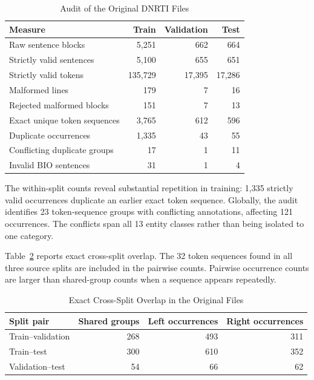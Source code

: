 \documentclass[conference]{IEEEtran}
\begin{document}
\begin{table}[t]
\caption{Audit of the Original DNRTI Files}
\label{tab:source-audit}
\centering
\small
\begin{tabular}{lrrr}
\toprule
Measure & Train & Validation & Test \\
\midrule
Raw sentence blocks & 5,251 & 662 & 664 \\
Strictly valid sentences & 5,100 & 655 & 651 \\
Strictly valid tokens & 135,729 & 17,395 & 17,286 \\
Malformed lines & 179 & 7 & 16 \\
Rejected malformed blocks & 151 & 7 & 13 \\
Exact unique token sequences & 3,765 & 612 & 596 \\
Duplicate occurrences & 1,335 & 43 & 55 \\
Conflicting duplicate groups & 17 & 1 & 11 \\
Invalid BIO sentences & 31 & 1 & 4 \\
\bottomrule
\end{tabular}
\end{table}

The within-split counts reveal substantial repetition in training: 1,335 strictly valid occurrences duplicate an earlier exact token sequence. Globally, the audit identifies 23 token-sequence groups with conflicting annotations, affecting 121 occurrences. The conflicts span all 13 entity classes rather than being isolated to one category.

Table~\ref{tab:overlap} reports exact cross-split overlap. The 32 token sequences found in all three source splits are included in the pairwise counts. Pairwise occurrence counts are larger than shared-group counts when a sequence appears repeatedly.

\begin{table}[t]
\caption{Exact Cross-Split Overlap in the Original Files}
\label{tab:overlap}
\centering
\small
\begin{tabular}{lrrr}
\toprule
Split pair & Shared groups & Left occurrences & Right occurrences \\
\midrule
Train--validation & 268 & 493 & 311 \\
Train--test & 300 & 610 & 352 \\
Validation--test & 54 & 66 & 62 \\
\bottomrule
\end{tabular}
\end{table}
\end{document}
